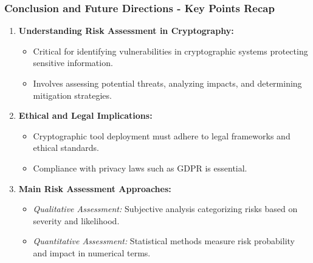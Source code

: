 \documentclass{beamer}
\begin{document}
\begin{frame}[fragile]
    \frametitle{Conclusion and Future Directions - Key Points Recap}
    \begin{enumerate}
        \item \textbf{Understanding Risk Assessment in Cryptography:}
        \begin{itemize}
            \item Critical for identifying vulnerabilities in cryptographic systems protecting sensitive information.
            \item Involves assessing potential threats, analyzing impacts, and determining mitigation strategies.
        \end{itemize}

        \item \textbf{Ethical and Legal Implications:}
        \begin{itemize}
            \item Cryptographic tool deployment must adhere to legal frameworks and ethical standards.
            \item Compliance with privacy laws such as GDPR is essential.
        \end{itemize}

        \item \textbf{Main Risk Assessment Approaches:}
        \begin{itemize}
            \item \textit{Qualitative Assessment:} Subjective analysis categorizing risks based on severity and likelihood.
            \item \textit{Quantitative Assessment:} Statistical methods measure risk probability and impact in numerical terms.
        \end{itemize}
    \end{enumerate}
\end{frame}
\end{document}

